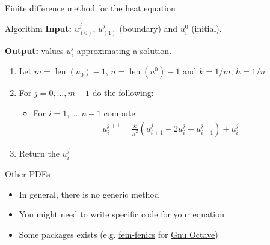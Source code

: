 \documentclass[11pt]{beamer}
\begin{document}
\begin{frame}{Finite difference method for the heat equation}
	\begin{block}{Algorithm}
		\textbf{Input:} $u_{(0)}^j$, $u_{(1)}^j$ (boundary)
			and $u_i^0$ (initial).

		\vspace{0.3cm}
		\textbf{Output:} values $u_i^j$ approximating a solution.

		\vspace{0.3cm}
		\begin{enumerate}
			\item Let  $m=\operatorname{len}(u_0)-1$,
				$n=\operatorname{len}(u^0)-1$ and $k=1/m$, $h=1/n$
			\item For $j=0,\dots, m-1$ do the following:
				\begin{itemize}
					\item For $i=1,\dots, n-1$ compute
						\begin{align*}
							u_i^{j+1} = \frac{k}{h^2}\left(u_{i+1}^j - 
							             2u_i^j + u_{i-1}^j\right) + u_i^j
						\end{align*}
				\end{itemize}
			\item Return the $u_i^j$
		\end{enumerate}
	\end{block}
\end{frame}

\begin{frame}{Other PDEs}
	\begin{itemize}
		\item In general, there is no generic method
		\item You might need to write specific code for your equation
		\item Some packages exists
			(e.g. \href{https://wiki.octave.org/Fem-fenics}{fem-fenics} for
			\href{https://www.gnu.org/software/octave/index}{Gnu Octave})
	\end{itemize}
\end{frame}
\end{document}
